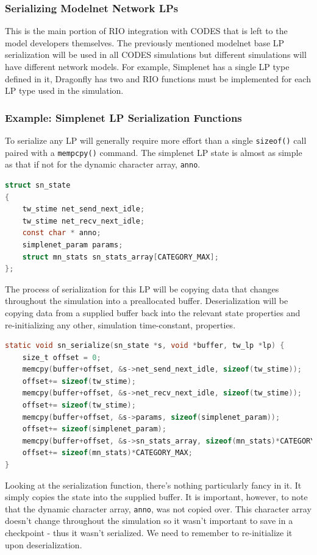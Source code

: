 \documentclass[letterpaper, 11 pt, conference]{IEEEtran}
\begin{document}
\subsubsection{Serializing Modelnet Network LPs}
This is the main portion of RIO integration with CODES that is left to the model developers themselves. The previously mentioned modelnet base LP serialization will be used in all CODES simulations but different simulations will have different network models. For example, Simplenet has a single LP type defined in it, Dragonfly has two and RIO functions must be implemented for each LP type used in the simulation. 


\subsubsection{Example: Simplenet LP Serialization Functions}
To serialize any LP will generally require more effort than a single \texttt{sizeof()} call paired with a \texttt{mempcpy()} command. The simplenet LP state is almost as simple as that if not for the dynamic character array, \texttt{anno}.

\begin{lstlisting}[language=C]
struct sn_state
{
	tw_stime net_send_next_idle;
	tw_stime net_recv_next_idle;
	const char * anno;
	simplenet_param params;
	struct mn_stats sn_stats_array[CATEGORY_MAX];
};
\end{lstlisting}

The process of serialization for this LP will be copying data that changes throughout the simulation into a preallocated buffer. Deserialization will be copying data from a supplied buffer back into the relevant state properties and re-initializing any other, simulation time-constant, properties.

\begin{lstlisting}[language=C]
static void sn_serialize(sn_state *s, void *buffer, tw_lp *lp) {
	size_t offset = 0;
	memcpy(buffer+offset, &s->net_send_next_idle, sizeof(tw_stime));
	offset+= sizeof(tw_stime);
	memcpy(buffer+offset, &s->net_recv_next_idle, sizeof(tw_stime));
	offset+= sizeof(tw_stime);
	memcpy(buffer+offset, &s->params, sizeof(simplenet_param));
	offset+= sizeof(simplenet_param);
	memcpy(buffer+offset, &s->sn_stats_array, sizeof(mn_stats)*CATEGORY_MAX);
	offset+= sizeof(mn_stats)*CATEGORY_MAX;
}
\end{lstlisting}

Looking at the serialization function, there's nothing particularly fancy in it. It simply copies the state into the supplied buffer. It is important, however, to note that the dynamic character array, \texttt{anno}, was not copied over. This character array doesn't change throughout the simulation so it wasn't important to save in a checkpoint - thus it wasn't serialized. We need to remember to re-initialize it upon deserialization.
\end{document}
